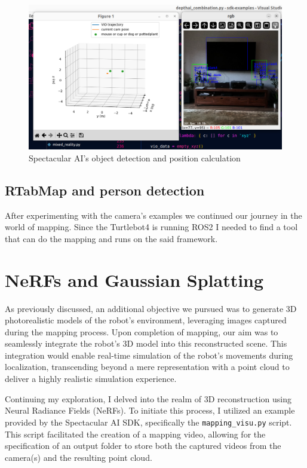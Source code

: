 \begin{figure}[H]
	\centering
	\includegraphics[width=150mm, keepaspectratio]{figures/spectacular_ai_depthai_combination.png}
	\caption{Spectacular AI's object detection and position calculation}
	\label{fig:SPAI_depthai}
\end{figure}

\subsection{RTabMap and person detection}

After experimenting with the camera's examples we continued our journey in the world of mapping. Since the Turtlebot4 is running ROS2 I needed to find a tool that can do the mapping and runs on the said framework.

\section{NeRFs and Gaussian Splatting}

As previously discussed, an additional objective we pursued was to generate 3D photorealistic models of the robot's environment, leveraging images captured during the mapping process. Upon completion of mapping, our aim was to seamlessly integrate the robot's 3D model into this reconstructed scene. This integration would enable real-time simulation of the robot's movements during localization, transcending beyond a mere representation with a point cloud to deliver a highly realistic simulation experience.

Continuing my exploration, I delved into the realm of 3D reconstruction using Neural Radiance Fields (NeRFs)\cite{nerf}. To initiate this process, I utilized an example provided by the Spectacular AI SDK, specifically the \verb|mapping_visu.py| script. This script facilitated the creation of a mapping video, allowing for the specification of an output folder to store both the captured videos from the camera(s) and the resulting point cloud.

